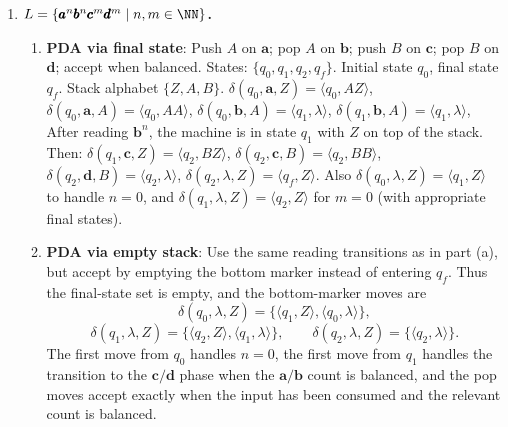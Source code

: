 \begin{enumerate}[{10.}1. ]
\textbf{Example}: $L = \{\pmb{ab}\}$.

\textbf{Proof}: Every one-state PDA $P$ with state set $\{t\}$, start state $t$, and final states $\{t\}$ trivially accepts $\lambda$: the initial configuration has $P$ already in the (unique) final state with empty input, so $\lambda$ is accepted regardless of the stack content. Since $\lambda \notin L = \{\pmb{ab}\}$, no one-state PDA via final state can recognize $L$.

More generally, any finite language that does not contain $\lambda$ is not recognizable by any one-state PDA via final state, since such a machine always accepts $\lambda$. \qed

\item \textbf{$L=\{\pmb{a}^n\pmb{b}^n\pmb{c}^m\pmb{d}^m \mid n,m\in\NN\}$.}

\begin{enumerate}
\item \textbf{PDA via final state}: Push $A$ on $\pmb{a}$; pop $A$ on $\pmb{b}$; push $B$ on $\pmb{c}$; pop $B$ on $\pmb{d}$; accept when balanced.
States: $\{q_0,q_1,q_2,q_f\}$. Initial state $q_0$, final state $q_f$. Stack alphabet $\{Z,A,B\}$.
$\delta(q_0,\pmb{a},Z)=\langle q_0,AZ\rangle$, $\delta(q_0,\pmb{a},A)=\langle q_0,AA\rangle$,
$\delta(q_0,\pmb{b},A)=\langle q_1,\lambda\rangle$, $\delta(q_1,\pmb{b},A)=\langle q_1,\lambda\rangle$,
After reading $\pmb{b}^n$, the machine is in state $q_1$ with $Z$ on top of the stack. Then:
$\delta(q_1,\pmb{c},Z)=\langle q_2,BZ\rangle$, $\delta(q_2,\pmb{c},B)=\langle q_2,BB\rangle$,
$\delta(q_2,\pmb{d},B)=\langle q_2,\lambda\rangle$, $\delta(q_2,\lambda,Z)=\langle q_f,Z\rangle$.
Also $\delta(q_0,\lambda,Z)=\langle q_1,Z\rangle$ to handle $n=0$, and $\delta(q_1,\lambda,Z)=\langle q_2,Z\rangle$ for $m=0$ (with appropriate final states).

\item \textbf{PDA via empty stack}: Use the same reading transitions as in
part (a), but accept by emptying the bottom marker instead of entering
$q_f$. Thus the final-state set is empty, and the bottom-marker moves are
\[
\delta(q_0,\lambda,Z)=\{\langle q_1,Z\rangle,\langle q_0,\lambda\rangle\},
\]
\[
\delta(q_1,\lambda,Z)=\{\langle q_2,Z\rangle,\langle q_1,\lambda\rangle\},
\qquad
\delta(q_2,\lambda,Z)=\{\langle q_2,\lambda\rangle\}.
\]
The first move from $q_0$ handles $n=0$, the first move from $q_1$ handles
the transition to the $\pmb{c}/\pmb{d}$ phase when the
$\pmb{a}/\pmb{b}$ count is balanced, and the pop moves accept exactly when the
input has been consumed and the relevant count is balanced.


\end{enumerate}
\end{enumerate}
